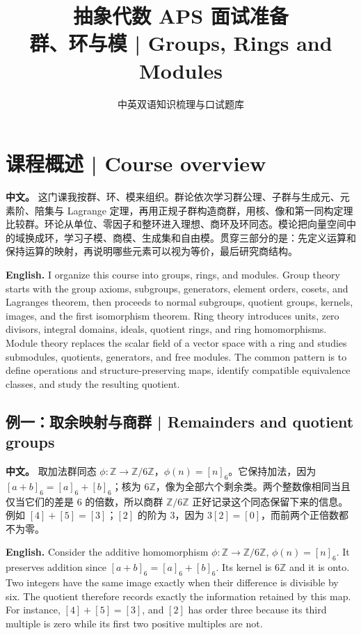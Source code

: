 \documentclass[UTF8,11pt,a4paper]{ctexart}
\title{抽象代数 APS 面试准备\\[4pt]\large 群、环与模 | Groups, Rings and Modules}
\author{中英双语知识梳理与口试题库}
\date{}
\newcommand{\APS}[2]{\par\noindent\textbf{中文。} #1\par\noindent\textbf{English.} #2\par\smallskip}
\begin{document}
\maketitle
\section*{课程概述 | Course overview}
\APS{这门课我按群、环、模来组织。群论依次学习群公理、子群与生成元、元素阶、陪集与 Lagrange 定理，再用正规子群构造商群，用核、像和第一同构定理比较群。环论从单位、零因子和整环进入理想、商环及环同态。模论把向量空间中的域换成环，学习子模、商模、生成集和自由模。贯穿三部分的是：先定义运算和保持运算的映射，再说明哪些元素可以视为等价，最后研究商结构。}{I organize this course into groups, rings, and modules. Group theory starts with the group axioms, subgroups, generators, element orders, cosets, and Lagrange\textquotesingle s theorem, then proceeds to normal subgroups, quotient groups, kernels, images, and the first isomorphism theorem. Ring theory introduces units, zero divisors, integral domains, ideals, quotient rings, and ring homomorphisms. Module theory replaces the scalar field of a vector space with a ring and studies submodules, quotients, generators, and free modules. The common pattern is to define operations and structure-preserving maps, identify compatible equivalence classes, and study the resulting quotient.}
\subsection*{例一：取余映射与商群 | Remainders and quotient groups}
\APS{取加法群同态 $\phi:\mathbb Z\to\mathbb Z/6\mathbb Z$，$\phi(n)=[n]_6$。它保持加法，因为 $[a+b]_6=[a]_6+[b]_6$；核为 $6\mathbb Z$，像为全部六个剩余类。两个整数像相同当且仅当它们的差是 $6$ 的倍数，所以商群 $\mathbb Z/6\mathbb Z$ 正好记录这个同态保留下来的信息。例如 $[4]+[5]=[3]$；$[2]$ 的阶为 $3$，因为 $3[2]=[0]$，而前两个正倍数都不为零。}{Consider the additive homomorphism $\phi:\mathbb Z\to\mathbb Z/6\mathbb Z$, $\phi(n)=[n]_6$. It preserves addition since $[a+b]_6=[a]_6+[b]_6$. Its kernel is $6\mathbb Z$ and it is onto. Two integers have the same image exactly when their difference is divisible by six. The quotient therefore records exactly the information retained by this map. For instance, $[4]+[5]=[3]$, and $[2]$ has order three because its third multiple is zero while its first two positive multiples are not.}
\end{document}
